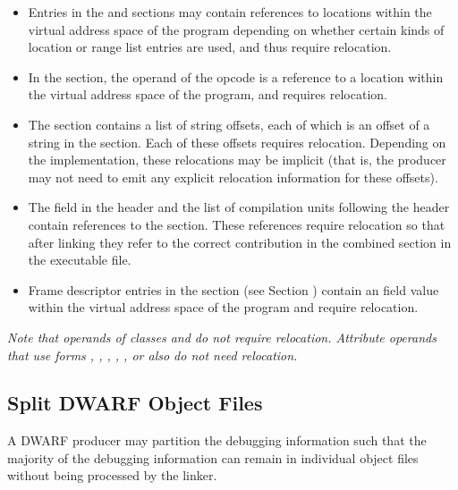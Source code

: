 \begin{itemize}
\item Entries in the \dotdebugloclists{} and \dotdebugrnglists{} sections may
contain references to locations within the virtual address space of the 
program depending on whether certain kinds of location or range
list entries are used, and thus require relocation.

\item In the \dotdebugline{} section, the operand of the \DWLNEsetaddress{}
opcode is a reference to a location within the virtual address space
of the program, and requires relocation.

\item The \dotdebugstroffsets{} section contains a list of string offsets,
each of which is an offset of a string in the \dotdebugstr{} section. Each
of these offsets requires relocation. Depending on the implementation,
these relocations may be implicit (that is, the producer may not need to
emit any explicit relocation information for these offsets).

\item The \HFNdebuginfooffset{} field in the \dotdebugaranges{} header and 
the list of compilation units following the \dotdebugnames{} header contain 
references to the \dotdebuginfo{} section.  These references require relocation 
so that after linking they refer to the correct contribution in the combined 
\dotdebuginfo{} section in the executable file.

\item Frame descriptor entries in the \dotdebugframe{} section 
(see Section ) contain an 
\HFNinitiallocation{} field value within the virtual address 
space of the program and require relocation. 

\end{itemize}

\textit{Note that operands of classes 
\CLASSconstant{} and 
\CLASSflag{} do not require relocation. Attribute operands that use 
forms \DWFORMstring{},
\DWFORMrefone, \DWFORMreftwo, \DWFORMreffour, \DWFORMrefeight, or
\DWFORMrefudata{} also do not need relocation.}

\subsection{Split DWARF Object Files}
\label{datarep:splitdwarfobjectfiles}
A DWARF producer may partition the debugging
information such that the majority of the debugging
information can remain in individual object files without
being processed by the linker. 

